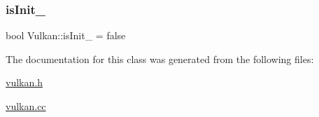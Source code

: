 \subsubsection{\texorpdfstring{is\+Init\+\_\+}{isInit\_}}
{\footnotesize\ttfamily bool Vulkan\+::is\+Init\+\_\+ = false\hspace{0.3cm}{\ttfamily [private]}}



The documentation for this class was generated from the following files\+:\begin{DoxyCompactItemize}
\item 
\mbox{\hyperlink{vulkan_8h}{vulkan.\+h}}\item 
\mbox{\hyperlink{vulkan_8cc}{vulkan.\+cc}}\end{DoxyCompactItemize}
